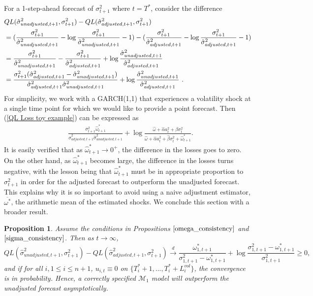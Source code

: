 \documentclass[11pt,3p,review,authoryear]{elsarticle}
\def\mc#1{\mathcal{#1}} %
\def\mc#1{\mathcal{#1}}
\newtheorem{prop}{Proposition}
\theoremstyle{definition}
\begin{document}
For a 1-step-ahead forecast of $\sigma^{2}_{t+1}$ where $t=T^{*}$, consider the difference 
\begin{align}
  & QL(\hat\sigma_{unadjusted,t+1}^{2},\sigma^{2}_{t+1})-QL(\hat\sigma^{2}_{adjusted,t+1},\sigma^{2}_{t+1})\notag \\
   & =(\frac{\sigma_{t+1}^{2}}{\hat\sigma^{2}_{unadjusted,t+1}} - \log{\frac{\sigma_{t+1}^{2}}{\hat\sigma^{2}_{unadjusted,t+1}} } - 1) - (\frac{\sigma_{t+1}^{2}}{\hat\sigma^{2}_{adjusted,t+1}} - \log{\frac{\sigma_{t+1}^{2}}{\hat\sigma^{2}_{adjusted,t+1}}} - 1)\notag\\
   & = \frac{\sigma_{t+1}^{2}}{\hat\sigma^{2}_{unadjusted,t+1}} - \frac{\sigma_{t+1}^{2}}{\hat\sigma^{2}_{adjusted,t+1}}+ \log{\frac{\hat\sigma^{2}_{unadjusted,t+1}}{\hat\sigma^{2}_{adjusted,t+1}}}\notag\\
   & = \frac{\sigma_{t+1}^{2}(\hat\sigma^{2}_{adjusted,t+1}-\hat\sigma^{2}_{unadjusted,t+1})}{\hat\sigma^{2}_{adjusted,t+1}\hat\sigma^{2}_{unadjusted,t+1}} + \log{\frac{\hat\sigma^{2}_{unadjusted,t+1}}{\hat\sigma^{2}_{adjusted,t+1}}}\label{QL Loss toy example} \text{ .}
\end{align}
For simplicity, we work with a GARCH(1,1) that experiences a volatility shock at a single time point for which we would like to provide a point forecast.  Then (\ref{QL Loss toy example}) can be expressed as
\begin{align*}
   &\frac{\sigma^{2}_{t+1}\hat\omega^{*}_{t+1} }{\hat\sigma^{2}_{adjusted,t+1}\hat\sigma^{2}_{unadjusted,t+1}} + \log{\frac{\hat\omega + \hat\alpha a_{t}^{2} + \hat\beta\sigma_{t}^{2}}{\hat\omega + \hat\alpha a_{t}^{2} + \hat\beta\sigma_{t}^{2} + \hat\omega^{*}_{t+1}}}.
\end{align*}\label{QL Loss Consistency - GARCH(1,1)}
It is easily verified that as $\hat\omega^{*}_{t+1} \rightarrow 0^{+}$, the difference in the losses goes to zero.  On the other hand, as $\hat\omega^{*}_{t+1}$ becomes large, the difference in the losses turns negative, with the lesson being that $\hat\omega^{*}_{t+1}$ must be in appropriate proportion to $\sigma^{2}_{t+1}$ in order for the adjusted forecast to outperform the unadjusted forecast.  This explains why it is so important to avoid using a naive adjustment estimator, $\overline{\omega^{*}}$, the arithmetic mean of the estimated shocks.  We conclude this section with a broader result. 

\begin{prop}\label{asymptotic_consistency}
Assume the conditions in Propositions $\ref{omega_consistency}$ and $\ref{sigma_consistency}$.  Then as $t\rightarrow \infty$,
$$QL(\hat\sigma_{unadjusted,t+1}^{2},\sigma^{2}_{t+1})-QL(\hat\sigma^{2}_{adjusted,t+1},\sigma^{2}_{t+1}) \overset{d}{\longrightarrow} \frac{\omega_{1,t+1}^{*}}{\sigma^{2}_{1,t+1}-\omega_{1,t+1}^{*}} + \log{\frac{\sigma_{1,t+1}^{2}-\omega_{1,t+1}^{*}}{\sigma_{1,t+1}^{2}} } \geq 0,$$ and if for all $i, 1 \leq i \leq n+ 1$, $u_{i,t} \equiv 0$ on $\{T^{*}_{i}+1,... ,T^{*}_{i}+L_{i}^{vol}\}$, the convergence is in probability.  Hence, a correctly specified $\mc{M}_1$ model will outperform the unadjusted forecast asymptotically.
\end{prop}
\end{document}
